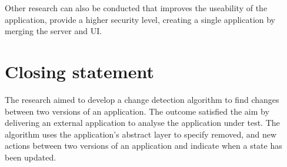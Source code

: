 Other research can also be conducted that improves the useability of the application, provide a higher security level, creating a single application by merging the \dotnet server and UI. 

\section{Closing statement}
The research aimed to develop a change detection algorithm to find changes between two versions of an application. The outcome satisfied the aim by delivering an external application to analyse the application under test. The algorithm uses the application's abstract layer to specify removed, and new actions between two versions of an application and indicate when a state has been updated. 



